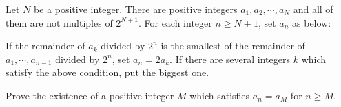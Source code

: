 Let $N$ be a positive integer. There are positive integers $a_{1}, a_{2},\cdots, a_{N}$ and all of them are not multiples of $2^{N+1}$. For each integer $n\geq N+1$, set $a_{n}$ as below:

If the remainder of $a_{k}$ divided by $2^{n}$ is the smallest of the remainder of $a_{1},\cdots, a_{n-1}$ divided by $2^{n}$, set $a_{n}=2a_{k}$. If there are several integers $k$ which satisfy the above condition, put the biggest one.

Prove the existence of a positive integer $M$ which satisfies $a_{n}=a_{M}$ for $n\geq M$.